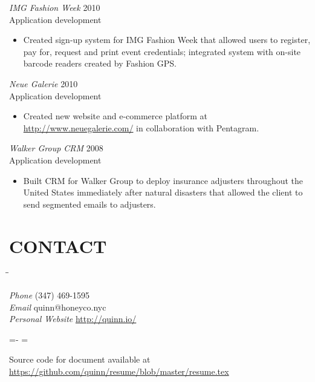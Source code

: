 \documentclass[line,margin]{res}
\begin{document}
\begin{resume}
    {\sl IMG Fashion Week}
    \hfill 2010 \\
    Application development
    \begin{itemize} \itemsep -2pt
        \item
              Created sign-up system for IMG Fashion Week that allowed users to
              register, pay for, request and print event credentials; integrated
              system with on-site barcode readers created by Fashion GPS.
    \end{itemize}

    {\sl Neue Galerie}
    \hfill 2010 \\
    Application development
    \begin{itemize} \itemsep -2pt
        \item
              Created new website and e-commerce platform at
              \mbox{\url{http://www.neuegalerie.com/}} in collaboration with
              Pentagram.

    \end{itemize}

    \begin{samepage}
        {\sl Walker Group CRM}
        \hfill 2008 \\
        Application development
        \begin{itemize} \itemsep -2pt
            \item
                  Built CRM for Walker Group to deploy insurance adjusters
                  throughout the United States immediately after natural disasters
                  that allowed the client to send segmented emails to adjusters.

        \end{itemize}
    \end{samepage}

    \section{CONTACT}
    \vspace{-2.3ex}
    \begin{tabbing}
        \hspace{1.5in}\= \hspace{2.0in}\= \kill

        {\sl Phone}            \> (347) 469-1595 \\
        {\sl Email}            \> quinn@honeyco.nyc \\
        {\sl Personal Website} \> \url{http://quinn.io/} \\

    \end{tabbing}

    \vfill
    \leftskip=-\hoffset
    \advance\textwidth\hoffset
    \hsize=\textwidth
    \fullline
    \vskip 2pt

    Source code for document available at
    \url{https://github.com/quinn/resume/blob/master/resume.tex}

\end{resume}
\end{document}
